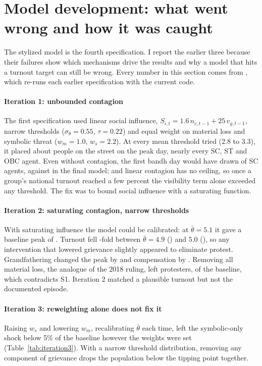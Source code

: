 \documentclass[11pt,a4paper]{article}
\begin{document}
\section{Model development: what went wrong and how it was caught}
\label{sec:development}

The stylized model is the fourth specification. I report the earlier three because their failures show which mechanisms drive the results and why a model that hits a turnout target can still be wrong. Every number in this section comes from , which re-runs each earlier specification with the current code.

\paragraph{Iteration 1: unbounded contagion} The first specification used linear social influence, $S_{i,t}=1.6\,n_{c,t-1}+25\,v_{g,t-1}$, narrow thresholds ($\sigma_\theta=0.55$, $\tau=0.22$) and equal weight on material loss and symbolic threat ($w_m=1.0$, $w_s=2.2$). At every mean threshold tried (2.8 to 3.3), it placed about \HistOnePeak{} people on the street on the peak day, nearly every SC, ST and OBC agent. Even without contagion, the first bandh day would have drawn \HistOneBandhSC{} of SC agents, against \HistFinalBandhSC{} in the final model; and linear contagion has no ceiling, so once a group's national turnout reached a few percent the visibility term alone exceeded any threshold. The fix was to bound social influence with a saturating function.

\paragraph{Iteration 2: saturating contagion, narrow thresholds} With saturating influence the model could be calibrated: at $\bar\theta=5.1$ it gave a baseline peak of \HistTwoBaseline{}. Turnout fell \HistTwoFallFactor-fold between $\bar\theta=4.9$ (\HistTwoPeakAtFourNine) and $5.0$ (\HistTwoPeakAtFive), so any intervention that lowered grievance slightly appeared to eliminate protest. Grandfathering changed the peak by \HistTwoChangeGrandfathering{} and compensation by \HistTwoChangeCompensation. Removing all material loss, the analogue of the 2018 ruling, left \HistTwoSymbolicOnly{} protesters, \HistTwoSymbolicShare{} of the baseline, which contradicts S1. Iteration 2 matched a plausible turnout but not the documented episode.

\paragraph{Iteration 3: reweighting alone does not fix it} Raising $w_s$ and lowering $w_m$, recalibrating $\bar\theta$ each time, left the symbolic-only shock below 5\% of the baseline however the weights were set (Table~\ref{tab:iteration3}). With a narrow threshold distribution, removing any component of grievance drops the population below the tipping point together.
\end{document}
